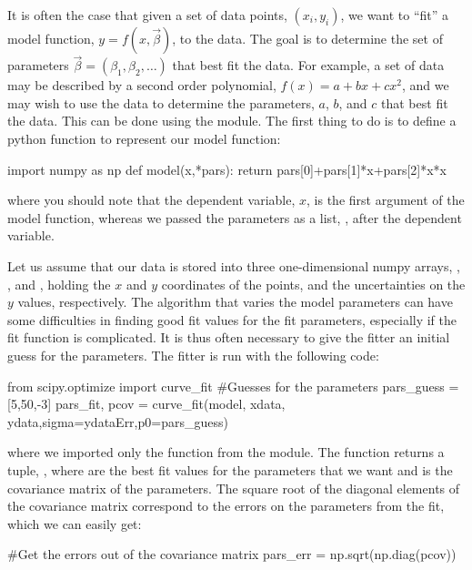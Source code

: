 It is often the case that given a set of data points, $(x_i,y_i)$, we want to ``fit'' a model function, $y=f(x,\vec\beta)$, to the data. The goal is to determine the set of parameters $\vec\beta=(\beta_1, \beta_2,\dots)$ that best fit the data. For example, a set of data may be described by a second order polynomial, $f(x)=a+bx+cx^2$, and we may wish to use the data to determine the parameters, $a$, $b$, and $c$ that best fit the data. This can be done using the  module. The first thing to do is to define a python function to represent our model function:
\begin{python}[caption = Defining a function to use for fitting]
import numpy as np
def model(x,*pars):
    return pars[0]+pars[1]*x+pars[2]*x*x
\end{python}
where you should note that the dependent variable, $x$, is the first argument of the model function, whereas we passed the parameters as a list, , after the dependent variable.

Let us assume that our data is stored into three one-dimensional numpy arrays, , , and , holding the $x$ and $y$ coordinates of the points, and the uncertainties on the $y$ values, respectively. The algorithm that varies the model parameters can have some difficulties in finding good fit values for the fit parameters, especially if the fit function is complicated. It is thus often necessary to give the fitter an initial guess for the parameters. The fitter is run with the following code:

\begin{python}[caption = Fitting a function to a set of xy data with error bars]
from scipy.optimize import curve_fit
#Guesses for the parameters
pars_guess = [5,50,-3]
pars_fit, pcov = curve_fit(model, xdata, ydata,sigma=ydataErr,p0=pars_guess)
\end{python}
where we imported only the  function from the  module. The  function returns a tuple, , where  are the best fit values for the parameters that we want and  is the covariance matrix of the parameters. The square root of the diagonal elements of the covariance matrix correspond to the errors on the parameters from the fit, which we can easily get:
\begin{python}[caption = Obtaining the errors from the fit]
#Get the errors out of the covariance matrix
pars_err = np.sqrt(np.diag(pcov))
\end{python}

